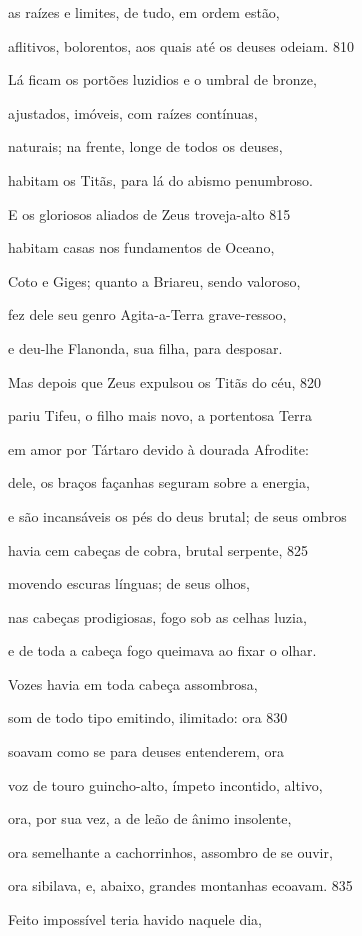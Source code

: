 as raízes e limites, de tudo, em ordem estão,

aflitivos, bolorentos, aos quais até os deuses odeiam. \num{810}

\quad{}Lá ficam os portões luzidios e o umbral de bronze,

ajustados, imóveis, com raízes contínuas,

naturais; na frente, longe de todos os deuses,

habitam os Titãs, para lá do abismo penumbroso.

E os gloriosos aliados de Zeus troveja-alto \num{815}

habitam casas nos fundamentos de Oceano,

Coto e Giges; quanto a Briareu, sendo valoroso,

fez dele seu genro Agita-a-Terra grave-ressoo,

e deu-lhe Flanonda, sua filha, para desposar.


Mas depois que Zeus expulsou os Titãs do céu, \num{820}

pariu Tifeu, o filho mais novo, a portentosa Terra

em amor por Tártaro devido à dourada Afrodite:

dele, os braços \dagger{}façanhas seguram sobre a energia\dagger{},

e são incansáveis os pés do deus brutal; de seus ombros

havia cem cabeças de cobra, brutal serpente, \num{825}

movendo escuras línguas; de seus olhos,

nas cabeças prodigiosas, fogo sob as celhas luzia,

e de toda a cabeça fogo queimava ao fixar o olhar.

Vozes havia em toda cabeça assombrosa,

som de todo tipo emitindo, ilimitado: ora \num{830}

soavam como se para deuses entenderem, ora

voz de touro guincho-alto, ímpeto incontido, altivo,

ora, por sua vez, a de leão de ânimo insolente,

ora semelhante a cachorrinhos, assombro de se ouvir,

ora sibilava, e, abaixo, grandes montanhas ecoavam. \num{835}

Feito impossível teria havido naquele dia,


